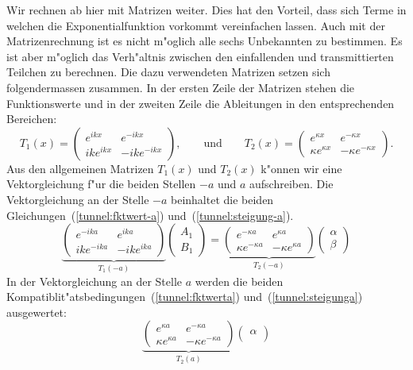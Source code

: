\begin{refsection}
Wir rechnen ab hier mit Matrizen weiter. 
Dies hat den Vorteil, dass sich Terme in welchen die Exponentialfunktion vorkommt vereinfachen lassen. 
Auch mit der Matrizenrechnung ist es nicht m"oglich alle sechs Unbekannten zu bestimmen. 
Es ist aber m"oglich das Verh"altnis zwischen den einfallenden und transmittierten Teilchen zu berechnen. 
Die dazu verwendeten Matrizen setzen sich folgendermassen zusammen.
In der ersten Zeile der Matrizen stehen die Funktionswerte und in der zweiten Zeile die Ableitungen in den entsprechenden Bereichen:
\[
T_1(x) =
\begin{pmatrix}
e^{ikx}
&
e^{-ikx}
\\
ike^{ikx}
&
-ike^{-ikx}
\end{pmatrix},
\qquad
\text{und}
\qquad
T_2(x) =
\begin{pmatrix}
e^{\kappa x}
&
e^{-\kappa x}
\\
\kappa e^{\kappa x}
&
-\kappa e^{-\kappa x}
\end{pmatrix}.
\]
Aus den allgemeinen Matrizen $T_1(x)$ und $T_2(x)$ k"onnen wir eine Vektorgleichung f"ur die beiden Stellen $-a$ und $a$ aufschreiben.
Die Vektorgleichung an der Stelle $-a$ beinhaltet die beiden Gleichungen~(\ref{tunnel:fktwert-a}) und~(\ref{tunnel:steigung-a}).
\[
\underbrace{
\begin{pmatrix}
e^{-ika}
&
e^{ika}
\\
ike^{-ika}
&
-ike^{ika}
\end{pmatrix}
}_{T_1(-a)}
\begin{pmatrix}
A_1
\\
B_1
\end{pmatrix}
 = 
\underbrace{
\begin{pmatrix}
e^{-\kappa a}
&
e^{\kappa a}
\\
\kappa e^{-\kappa a}
&
-\kappa e^{\kappa a}
\end{pmatrix}
}_{T_2(-a)}
\begin{pmatrix}
\alpha
\\
\beta
\end{pmatrix}
\]
In der Vektorgleichung an der Stelle $a$ werden die beiden Kompatiblit"atsbedingungen~(\ref{tunnel:fktwerta}) und~(\ref{tunnel:steigunga}) ausgewertet:
\[
\underbrace{
\begin{pmatrix}
e^{\kappa a}
&
e^{-\kappa a}
\\
\kappa e^{\kappa a}
&
-\kappa e^{-\kappa a}
\end{pmatrix}
}_{T_2(a)}
\begin{pmatrix}
\alpha
\\

\end{pmatrix}\]
\end{refsection}
